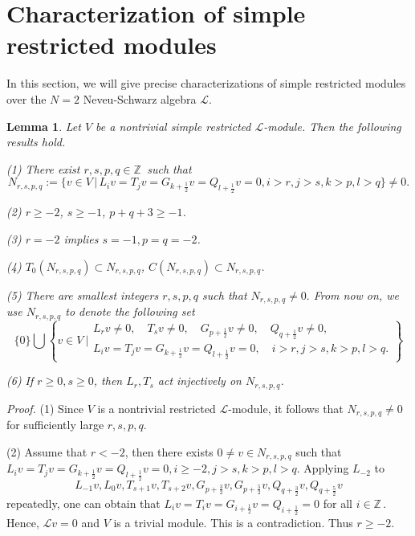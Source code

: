 \documentclass[12pt]{article}
\def\ssc{\scriptscriptstyle}
\def\Z{\mathbb{Z}{\ssc\,}}
\numberwithin{equation}{section}
\newtheorem{lemm}[theo]{Lemma}
\begin{document}

\section{Characterization of simple restricted modules}

In this section, we will give  precise characterizations of simple restricted modules over the $N=2$  Neveu-Schwarz algebra $\mathcal{L}$.

\begin{lemm}\label{N} Let $V$ be a nontrivial simple restricted $\mathcal{L}$-module. Then the following results hold.

{\rm (1)}  There exist $r,s,p,q\in\Z$ such that
$$N_{r,s,p,q}:=\{v\in V \,|\,L_iv=T_jv=G_{k+\frac{1}{2}}v=Q_{l+\frac{1}{2}}v=0, i>r,j>s,k>p,l>q\}\ne 0.
$$

{\rm (2)}  $r\ge -2$, $s\ge -1$, $p+q+3\ge -1$.

{\rm (3)} $r=-2$ implies  $s=-1,p=q=-2$.



{\rm (4)} $T_0(N_{r,s,p,q})\subset N_{r,s,p,q}$, $ C (N_{r,s,p,q})\subset N_{r,s,p,q}$.


{\rm (5)} There are  smallest integers $r,s,p,q$ such that $N_{r,s,p,q}\ne 0.$ From now on, we  use $ N_{r,s,p,q}$ to denote the following set
$$\{0\}\bigcup \left\{v\in V \ \bigg|\begin{array}{l}L_rv\ne 0,\quad T_sv\ne 0,\quad G_{p+\frac{1}{2}}v\ne 0,\quad  Q_{q+\frac{1}{2}}v\ne 0,\\
L_iv=T_jv=G_{k+\frac{1}{2}}v= Q_{l+\frac{1}{2}}v=0,\quad i>r,j>s,k>p,l>q.
\end{array}\right\}$$

 {\rm (6)} If $r\ge 0,s\ge 0$, then $L_r,T_s$ act injectively on  $N_{r,s,p,q}$.


\end{lemm}
{\it Proof.}  (1) Since $V$ is a nontrivial restricted $\mathcal{L}$-module, it follows  that $N_{r,s,p,q}\ne 0$ for sufficiently large $r,s,p,q$.



(2) Assume that $r<-2$, then there exists $0\ne v\in N_{r,s,p,q}$ such that $L_iv=T_jv=G_{k+\frac{1}{2}}v=Q_{l+\frac{1}{2}}v=0, i\ge -2,j>s,k>p,l>q$.  Applying $L_{-2}$ to
$$L_{-1}v,L_{0}v, T_{s+1}v, T_{s+2}v,G_{p+\frac{3}{2}}v,G_{p+\frac{5}{2}}v, Q_{q+\frac{3}{2}}v,Q_{q+\frac{5}{2}}v$$  repeatedly,
one can obtain that $L_iv=T_iv=G_{i+\frac{1}{2}}v=Q_{i+\frac{1}{2}}=0$ for all $i\in\Z$. Hence,
$\mathcal{L}v=0$ and $V$ is a trivial module. This is a contradiction. Thus $r\ge -2$.
\end{document}
